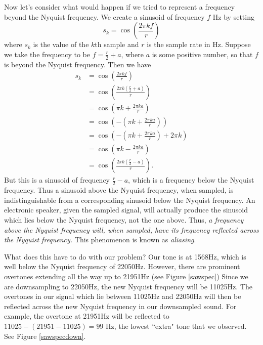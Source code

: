 Now let's consider what would happen if we tried to represent a frequency beyond the Nyquist frequency.
We create a sinusoid of frequency $f$ Hz by setting
$$s_k = \cos\left(\frac{2\pi kf}r\right)$$
where $s_k$ is the value of the $k$th sample and $r$ is the sample rate in Hz.
Suppose we take the frequency to be $f=\frac{r}2+a$, where $a$ is some positive number, so that $f$ is beyond the Nyquist frequency.
Then we have
\begin{align*}
s_k &= \cos\left(\frac{2\pi kf}r\right) \\
&= \cos\left(\frac{2\pi k(\frac{r}2+a)}r\right)\\
&= \cos\left(\pi k+\frac{2\pi ka}r\right)\\
&= \cos\left(-\left(\pi k+\frac{2\pi ka}r\right)\right)\\
&= \cos\left(-\left(\pi k+\frac{2\pi ka}r\right)+2\pi k \right)\\
&= \cos\left(\pi k-\frac{2\pi ka}r\right)\\
&= \cos\left(\frac{2\pi k(\frac{r}2-a)}r\right).
\end{align*}
But this is a sinusoid of frequency $\frac{r}2-a$, which is a frequency below the Nyquist frequency.
Thus a sinusoid above the Nyquist frequency, when sampled, is indistinguishable from a corresponding sinusoid below the Nyquist frequency.
An electronic speaker, given the sampled signal, will actually produce the sinusoid which lies below the Nyquist frequency, not the one above.
Thus, \emph{a frequency above the Nyquist frequency will, when sampled, have its frequency reflected across the Nyquist frequency.}
This phenomenon is known as \emph{aliasing}.

What does this have to do with our problem?
Our tone is at 1568Hz, which is well below the Nyquist frequency of 22050Hz.
However, there are prominent overtones extending all the way up to 21951Hz (see Figure \ref{sawspec})
Since we are downsampling to 22050Hz, the new Nyquist frequency will be 11025Hz.
The overtones in our signal which lie between 11025Hz and 22050Hz will then be reflected across the new Nyquist frequency in our downsampled sound.
For example, the overtone at 21951Hz will be reflected to $11025-(21951-11025)=99$ Hz, the lowest ``extra" tone that we observed.
See Figure \ref{sawspecdown}.

